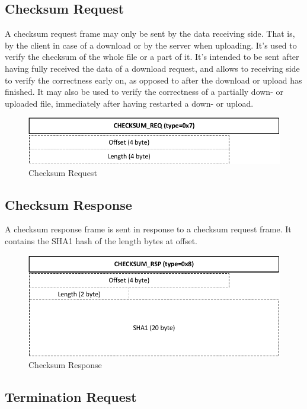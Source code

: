 \documentclass[]{article}
\begin{document}
\subsection{Checksum Request}
A checksum request frame may only be sent by the data receiving side. That is, by the client
in case of a download or by the server when uploading. It's used to verify the checksum of
the whole file or a part of it. It's intended to be sent after having fully received
the data of a download request, and allows to receiving side to verify the correctness early
on, as opposed to after the download or upload has finished. It may also be used to verify 
the correctness of a partially down- or uploaded file, immediately after having restarted
a down- or upload. 

\begin{figure}[H]
\centering
\includegraphics[width=\textwidth]{frames/checksum-req.pdf}
\caption{Checksum Request}
\label{CHECKSUM-REQ}
\end{figure}

\subsection{Checksum Response}
A checksum response frame is sent in response to a checksum request frame. It contains the SHA1
hash of the length bytes at offset. 

\begin{figure}[H]
\centering
\includegraphics[width=\textwidth]{frames/checksum-rsp.pdf}
\caption{Checksum Response}
\label{CHECKSUM-RSP}
\end{figure}

\subsection{Termination Request}
\end{document}
